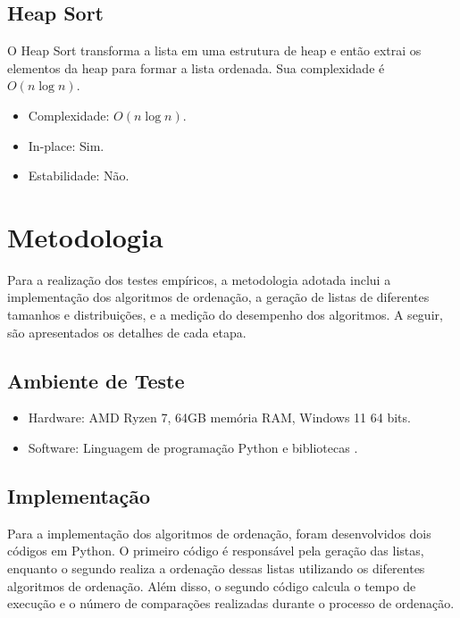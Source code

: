 \documentclass[tcc2]{uftex}
\begin{document}
\section{Heap Sort}
O Heap Sort transforma a lista em uma estrutura de heap e então extrai os elementos da heap para formar a lista ordenada. Sua complexidade é \(O(n \log n)\).

\begin{itemize}
    \item Complexidade: \(O(n \log n)\).
    \item In-place: Sim.
    \item Estabilidade: Não.
\end{itemize}

\chapter{Metodologia}

%

Para a realização dos testes empíricos, a metodologia adotada inclui a implementação dos algoritmos de ordenação, a geração de listas de diferentes tamanhos e distribuições, e a medição do desempenho dos algoritmos. A seguir, são apresentados os detalhes de cada etapa.

\section{Ambiente de Teste}

\begin{itemize}
    \item Hardware: AMD Ryzen 7, 64GB memória RAM, Windows 11 64 bits.
    \item Software: Linguagem de programação Python e bibliotecas .
\end{itemize}

\section{Implementação}
Para a implementação dos algoritmos de ordenação, foram desenvolvidos dois códigos em Python. O primeiro código é responsável pela geração das listas, enquanto o segundo realiza a ordenação dessas listas utilizando os diferentes algoritmos de ordenação. Além disso, o segundo código calcula o tempo de execução e o número de comparações realizadas durante o processo de ordenação.
\end{document}
